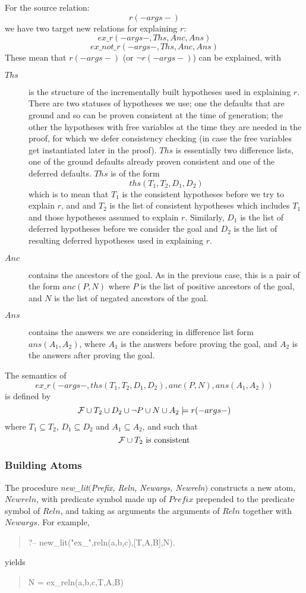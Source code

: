 For the source relation:
\[r( - args -)\]
we have two target new relations for explaining $r$:
\[ex\_r( - args - , Ths, Anc, Ans)\]
\[ex\_not\_r( - args - , Ths, Anc, Ans)\]
These mean that $r(-args-)$ (or $\neg r(-args-)$) can be explained, with
\begin{description}
\item[$Ths$] is the structure of the incrementally built hypotheses
used in explaining $r$. There are two statuses of hypotheses we
use; one the defaults that are ground and so can be proven
consistent at the time of generation;
the other the hypotheses with free variables at the time they
are needed in the proof, for which we defer consistency
checking (in case the free variables get instantiated later in the proof).
$Ths$ is essentially
two difference lists, one of the ground defaults already
proven consistent and one of the
deferred defaults. $Ths$ is of the form
\[ths(T_1,T_2,D_1,D_2)\]
which is to mean that $T_1$ is the consistent hypotheses before
we try to explain $r$, and
and $T_2$ is the list of consistent hypotheses which includes
$T_1$ and those hypotheses assumed to explain $r$.
Similarly, $D_1$ is the list of deferred hypotheses before we consider the goal
and $D_2$ is the list of resulting deferred hypotheses used in explaining $r$.

\item[$Anc$] contains the ancestors of the goal. As in the previous case,
this is a pair of the form
$anc(P,N)$ where $P$ is the list of positive ancestors of the goal,
and $N$ is the list of negated ancestors of the goal.

\item[$Ans$] contains the answers we are considering in difference list form
$ans(A_1,A_2)$, where $A_1$ is the answers before
proving the goal, and $A_2$ is the answers after proving the goal.
\end{description}

The semantics of
\[ex\_r(-args-,ths(T_1,T_2,D_1,D_2),anc(P,N),ans(A_1,A_2))\]
is defined by
\[{\cal F}\cup T_2 \cup D_2 \cup \neg P \cup N \cup A_2 \models r(-args-) \]
where $T_1\subseteq T_2$, $D_1\subseteq D_2$ and $A_1\subseteq A_2$, and
such that
\[{\cal F}\cup T_2 \hbox{ is consistent}\]

\subsubsection{Building Atoms}
The procedure {\em new\_lit$($Prefix, Reln, Newargs, Newreln\/}$)$ constructs
a new atom, $Newreln$, with predicate symbol made up of
$Prefix$ prepended to the
predicate symbol of $Reln$, and taking as arguments the arguments of $Reln$
together with $Newargs$.
For example,
\begin{quote}
?-- new\_lit("ex\_",reln(a,b,c),[T,A,B],N).
\end{quote}
yields
\begin{quote}
N = ex\_reln(a,b,c,T,A,B)
\end{quote}

